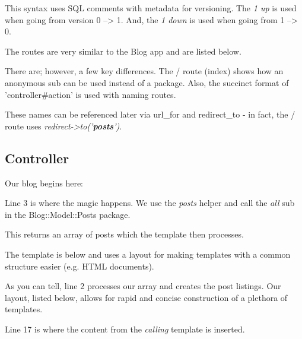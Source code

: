 \documentclass[14pt]{extreport}
\begin{document}
This syntax uses SQL comments with metadata for versioning.  The  \textit{1 up}
is used when going from version 0 --> 1.  And, the \textit{1 down} is used when
going from 1 --> 0.

The routes are very similar to the Blog app and are listed below.



There are; however, a few key differences.  The / route (index) shows how an
anonymous sub can be used instead of a package.  Also, the succinct format of
'controller\#action' is used with naming routes.  

These names can be referenced later via url\_for and redirect\_to - in fact,
the / route uses \textit{redirect->to('\textbf{posts}')}.

\subsection{Controller}

Our blog begins here:



Line 3 is where the magic happens. We use the \textit{posts} helper and call
the \textit{all} sub in the Blog::Model::Posts package.  

This returns an array of posts which the template then processes.



The template is below and uses a layout for making templates with a common
structure easier (e.g. HTML documents).



As you can tell, line 2 processes our array and creates the post listings.  Our
layout, listed below, allows for rapid and concise construction of a plethora
of templates.

\clearpage



Line 17 is where the content from the \textit{calling} template is inserted.
\end{document}
